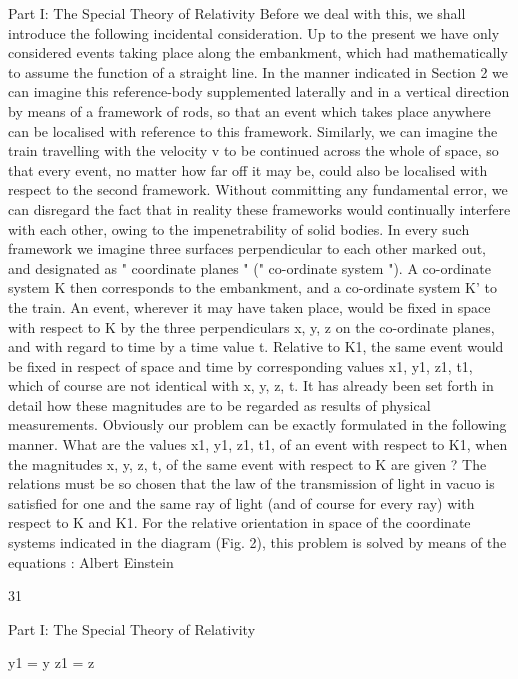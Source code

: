 \documentclass{article}
\begin{document}
Part I: The Special Theory of Relativity
Before we deal with this, we shall introduce the following incidental consideration. Up to
the present we have only considered events taking place along the embankment, which had
mathematically to assume the function of a straight line. In the manner indicated in Section
2 we can imagine this reference-body supplemented laterally and in a vertical direction by
means of a framework of rods, so that an event which takes place anywhere can be localised
with reference to this framework. Similarly, we can imagine the train travelling with the
velocity v to be continued across the whole
of space, so that every event, no matter how
far off it may be, could also be localised with
respect to the second framework. Without
committing any fundamental error, we can
disregard the fact that in reality these
frameworks would continually interfere with
each other, owing to the impenetrability of
solid bodies. In every such framework we
imagine three surfaces perpendicular to each
other marked out, and designated as " coordinate planes " (" co-ordinate system "). A co-ordinate system K then corresponds to the
embankment, and a co-ordinate system K' to the train. An event, wherever it may have
taken place, would be fixed in space with respect to K by the three perpendiculars x, y, z on
the co-ordinate planes, and with regard to time by a time value t. Relative to K1, the same
event would be fixed in respect of space and time by corresponding values x1, y1, z1, t1,
which of course are not identical with x, y, z, t. It has already been set forth in detail how
these magnitudes are to be regarded as results of physical measurements.
Obviously our problem can be exactly formulated in the following manner. What are the
values x1, y1, z1, t1, of an event with respect to K1, when the magnitudes x, y, z, t, of the
same event with respect to K are given ? The relations must be so chosen that the law of the
transmission of light in vacuo is satisfied for one and the same ray of light (and of course
for every ray) with respect to K and K1. For the relative orientation in space of the coordinate systems indicated in the diagram (Fig. 2), this problem is solved by means of the
equations :
Albert Einstein

31

Part I: The Special Theory of Relativity

y1 = y
z1 = z
\end{document}

